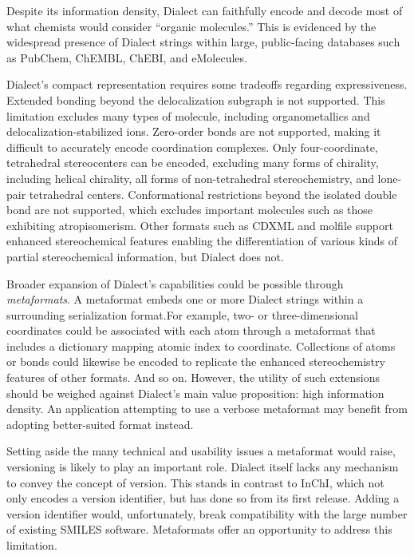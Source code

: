 \documentclass{article}
\begin{document}
Despite its information density, Dialect can faithfully encode and decode most of what chemists would consider \enquote{organic molecules.} This is evidenced by the widespread presence of Dialect strings within large, public-facing databases such as PubChem, ChEMBL, ChEBI, and eMolecules.

Dialect's compact representation requires some tradeoffs regarding expressiveness. Extended bonding beyond the delocalization subgraph is not supported. This limitation excludes many types of molecule, including organometallics and delocalization-\-stabilized ions. Zero-\-order bonds are not supported, making it difficult to accurately encode coordination complexes. Only four-\-coordinate, tetrahedral stereocenters can be encoded, excluding many forms of chirality, including helical chirality, all forms of non-\-tetrahedral stereochemistry, and lone-\-pair tetrahedral centers. Conformational restrictions beyond the isolated double bond are not supported, which excludes important molecules such as those exhibiting atropisomerism. Other formats such as CDXML and molfile support enhanced stereochemical features enabling the differentiation of various kinds of partial stereochemical information, but Dialect does not.

Broader expansion of Dialect's capabilities could be possible through \textit{metaformats}. A metaformat embeds one or more Dialect strings within a surrounding serialization format.For example, two- or three-dimensional coordinates could be associated with each atom through a metaformat that includes a dictionary mapping atomic index to coordinate. Collections of atoms or bonds could likewise be encoded to replicate the enhanced stereochemistry features of other formats. And so on. However, the utility of such extensions should be weighed against Dialect's main value proposition: high information density. An application attempting to use a verbose metaformat may benefit from adopting better-suited format instead.

Setting aside the many technical and usability issues a metaformat would raise, versioning is likely to play an important role. Dialect itself lacks any mechanism to convey the concept of version. This stands in contrast to InChI, which not only encodes a version identifier, but has done so from its first release. Adding a version identifier would, unfortunately, break compatibility with the large number of existing SMILES software. Metaformats offer an opportunity to address this limitation.
\end{document}

